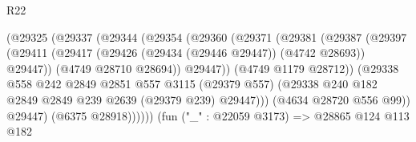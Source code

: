 \begin{lexlean}{R22}
\begin{coremodule}
                                        (@29325
                                          (@29337
                                            (@29344
                                              (@29354
                                                (@29360
                                                  (@29371
                                                    (@29381
                                                      (@29387
                                                        (@29397
                                                          (@29411
                                                            (@29417
                                                              (@29426
                                                                (@29434 (@29446 @29447))
                                                                (@4742 @28693))
                                                              @29447))
                                                          (@4749 @28710 @28694))
                                                        @29447))
                                                    (@4749 @1179 @28712))
                                                  (@29338
                                                    @558
                                                    @242
                                                    @2849
                                                    @2851
                                                    @557
                                                    @3115
                                                    (@29379 @557)
                                                    (@29338
                                                      @240
                                                      @182
                                                      @2849
                                                      @2849
                                                      @239
                                                      @2639
                                                      (@29379 @239)
                                                      @29447)))
                                                (@4634 @28720 @556 @99))
                                              @29447)
                                            (@6375 @28918))))))
                                  (fun ("_" : @22059 @3173) =>
                                  @28865
                                    @124
                                    @113
                                    @182

\end{coremodule}
\end{lexlean}
